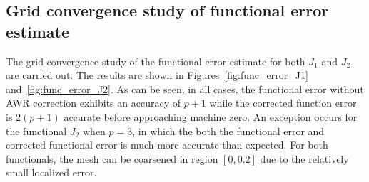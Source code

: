 \documentclass[a4paper]{article}
\begin{document}
\subsection{Grid convergence study of functional error estimate}
The grid convergence study of the functional error estimate for both $J_1$ and $J_2$ are carried out. The results are shown in Figures~\ref{fig:func_error_J1} and~\ref{fig:func_error_J2}. As can be seen, in all cases, the functional error without AWR correction exhibits an accuracy of $p+1$ while the corrected function error is $2(p+1)$ accurate before approaching machine zero. An exception occurs for the functional $J_2$ when $p=3$, in which the both the functional error and corrected functional error is much more accurate than expected. For both functionals, the mesh can be coarsened in region $[0, 0.2]$ due to the relatively small localized error. 
\end{document}
